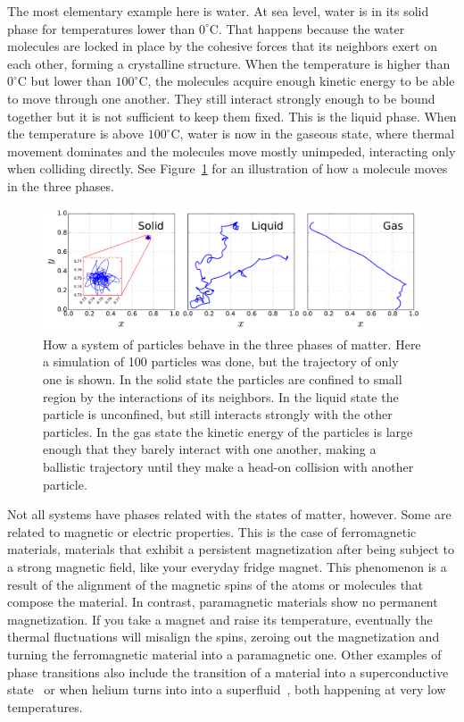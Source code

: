 The most elementary example here is water. At sea level, water is in its solid
phase for temperatures lower than $0^\circ$C. That happens because the water
molecules are locked in place by the cohesive forces that its neighbors exert
on each other, forming a crystalline structure. When the temperature is higher
than $0^\circ$C but lower than $100^\circ$C, the molecules acquire enough
kinetic energy to be able to move through one another. They still interact
strongly enough to be bound together but it is not sufficient to keep them
fixed. This is the liquid phase. When the temperature is above $100^\circ$C,
water is now in the gaseous state, where thermal movement dominates and the
molecules move mostly unimpeded, interacting only when colliding directly. See
Figure~\ref{fig:phases} for an illustration of how a molecule moves in the
three phases.

\begin{figure}[t]
\begin{center}
    \includegraphics[width=\textwidth]{chapters/ch2-crit/figs/phases}
\end{center}
\caption{How a system of particles behave in the three phases of matter. Here a
    simulation of 100 particles was done, but the trajectory of only one is
    shown. In the solid state the particles are confined to small region by
    the interactions of its neighbors. In the liquid state the particle is
    unconfined, but still interacts strongly with the other particles. In the
    gas state the kinetic energy of the particles is large enough that they
    barely interact with one another, making a ballistic trajectory until
    they make a head-on collision with another particle.}
\label{fig:phases}
\end{figure}

Not all systems have phases related with the states of matter, however. Some
are related to magnetic or electric properties. This is the case of
ferromagnetic materials, materials that exhibit a persistent magnetization
after being subject to a strong magnetic field, like your everyday fridge
magnet. This phenomenon is a result of the alignment of the magnetic spins of
the atoms or molecules that compose the material. In contrast, paramagnetic
materials show no permanent magnetization. If you take a magnet and raise its
temperature, eventually the thermal fluctuations will misalign the spins,
zeroing out the magnetization and turning the ferromagnetic material into a
paramagnetic one. Other examples of phase transitions also include the
transition of a material into a superconductive state~\cite{Fisher1991} or when
helium turns into into a superfluid~\cite{Campostrini2006}, both happening at
very low temperatures.

